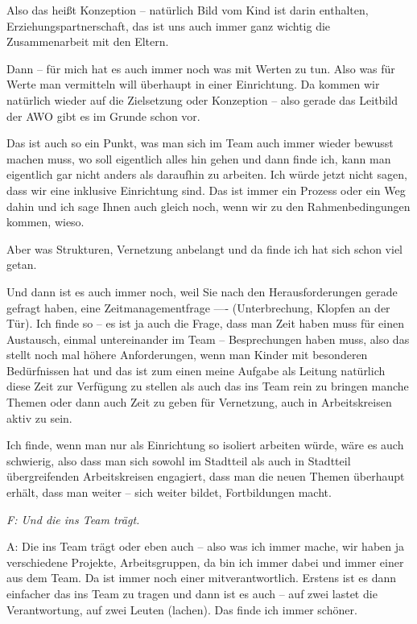 \begin{linenumbers*}
Also das heißt Konzeption -- natürlich Bild vom Kind ist darin enthalten, Erziehungspartnerschaft, das ist uns auch immer ganz wichtig die Zusammenarbeit mit den Eltern. 

Dann -- für mich hat es auch immer noch was mit Werten zu tun. Also was für Werte man vermitteln will überhaupt in einer Einrichtung. Da kommen wir natürlich wieder auf die Zielsetzung oder Konzeption -- also gerade das Leitbild der AWO gibt es im Grunde schon vor. 

Das ist auch so ein Punkt, was man sich im Team auch immer wieder bewusst machen muss, wo soll eigentlich alles hin gehen und dann finde ich, kann man eigentlich gar nicht anders als daraufhin zu arbeiten. 
Ich würde jetzt nicht sagen, dass wir eine inklusive Einrichtung sind. Das ist immer ein Prozess oder ein Weg dahin und ich sage Ihnen auch gleich noch, wenn 
wir zu den Rahmenbedingungen kommen, wieso. 

Aber was Strukturen, Vernetzung anbelangt und da finde ich hat sich schon viel getan. 

Und dann ist es auch immer noch, weil Sie nach den Herausforderungen gerade gefragt haben, eine Zeitmanagementfrage ---- (Unterbrechung, Klopfen an der Tür). Ich finde so -- es ist ja auch die Frage, dass man Zeit haben muss für einen Austausch, einmal untereinander im Team -- Besprechungen haben muss, also das stellt noch mal höhere Anforderungen, wenn man Kinder mit besonderen Bedürfnissen hat und das ist zum einen 
meine Aufgabe als Leitung natürlich diese Zeit zur Verfügung zu stellen als auch das ins Team rein zu bringen manche Themen oder dann auch Zeit zu geben für Vernetzung, auch in Arbeitskreisen aktiv zu sein. 

Ich finde, wenn man nur als Einrichtung so isoliert arbeiten würde, wäre es auch schwierig, also dass man sich sowohl im Stadtteil als auch in Stadtteil übergreifenden Arbeitskreisen engagiert, dass man die neuen Themen überhaupt erhält, dass man weiter -- sich weiter bildet, Fortbildungen macht. 

\emph{F: Und die ins Team trägt.}

A: Die ins Team trägt oder eben auch -- also was ich immer mache, wir haben ja verschiedene Projekte, Arbeitsgruppen, da bin ich immer dabei und immer einer aus dem Team. Da ist immer noch einer mitverantwortlich. Erstens ist es dann einfacher das ins Team zu tragen und dann ist es auch – auf zwei lastet die Verantwortung, auf zwei Leuten (lachen). Das finde ich immer schöner.


\end{linenumbers*}
